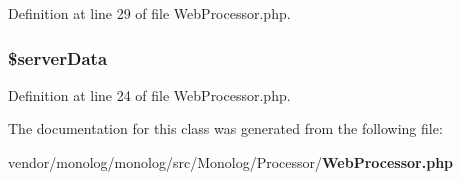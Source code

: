 Definition at line 29 of file Web\+Processor.\+php.

\subsubsection[{\$server\+Data}]{\setlength{\rightskip}{0pt plus 5cm}\$server\+Data\hspace{0.3cm}{\ttfamily [protected]}}\label{class_monolog_1_1_processor_1_1_web_processor_a6f16692663cf52942db3e7a25ee9f4c8}


Definition at line 24 of file Web\+Processor.\+php.



The documentation for this class was generated from the following file\+:\begin{DoxyCompactItemize}
\item 
vendor/monolog/monolog/src/\+Monolog/\+Processor/{\bf Web\+Processor.\+php}\end{DoxyCompactItemize}
